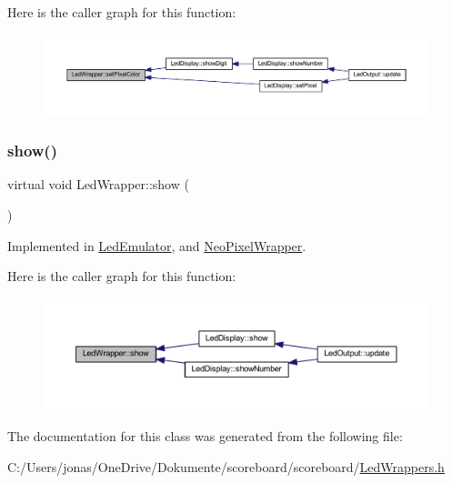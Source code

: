 Here is the caller graph for this function\+:
\nopagebreak
\begin{figure}[H]
\begin{center}
\leavevmode
\includegraphics[width=350pt]{class_led_wrapper_ac20a5afaaaaa2c275d7f6008ace09c41_icgraph}
\end{center}
\end{figure}
\mbox{\label{class_led_wrapper_a82048b562a501a0a46e5953d2cdb2549}} 
\subsubsection{\texorpdfstring{show()}{show()}}
{\footnotesize\ttfamily virtual void Led\+Wrapper\+::show (\begin{DoxyParamCaption}{ }\end{DoxyParamCaption})\hspace{0.3cm}{\ttfamily [pure virtual]}}



Implemented in \hyperlink{class_led_emulator_ad9a0629926516da0368b03d530a91815}{Led\+Emulator}, and \hyperlink{class_neo_pixel_wrapper_a965564daa3e81baefb9947c28633f06a}{Neo\+Pixel\+Wrapper}.

Here is the caller graph for this function\+:
\nopagebreak
\begin{figure}[H]
\begin{center}
\leavevmode
\includegraphics[width=350pt]{class_led_wrapper_a82048b562a501a0a46e5953d2cdb2549_icgraph}
\end{center}
\end{figure}


The documentation for this class was generated from the following file\+:\begin{DoxyCompactItemize}
\item 
C\+:/\+Users/jonas/\+One\+Drive/\+Dokumente/scoreboard/scoreboard/\hyperlink{_led_wrappers_8h}{Led\+Wrappers.\+h}\end{DoxyCompactItemize}

